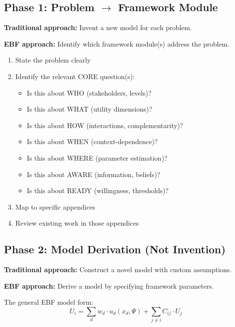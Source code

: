 \subsection{Phase 1: Problem $\to$ Framework Module}

\textbf{Traditional approach:} Invent a new model for each problem.

\textbf{EBF approach:} Identify which framework module(s) address the problem.

\begin{tcolorbox}[colback=gray!5!white, colframe=gray!75!black,
    title=\textbf{Phase 1 Checklist}]
\begin{enumerate}[nosep]
    \item State the problem clearly
    \item Identify the relevant CORE question(s):
    \begin{itemize}[nosep]
        \item Is this about WHO (stakeholders, levels)?
        \item Is this about WHAT (utility dimensions)?
        \item Is this about HOW (interactions, complementarity)?
        \item Is this about WHEN (context-dependence)?
        \item Is this about WHERE (parameter estimation)?
        \item Is this about AWARE (information, beliefs)?
        \item Is this about READY (willingness, thresholds)?
    \end{itemize}
    \item Map to specific appendices
    \item Review existing work in those appendices
\end{enumerate}
\end{tcolorbox}

\subsection{Phase 2: Model Derivation (Not Invention)}

\textbf{Traditional approach:} Construct a novel model with custom assumptions.

\textbf{EBF approach:} Derive a model by specifying framework parameters.

The general EBF model form:
\begin{equation}
U_i = \sum_d w_d \cdot u_d(x_d, \Psi) + \sum_{j \neq i} C_{ij} \cdot U_j
\label{eq:general-ebf}
\end{equation}

